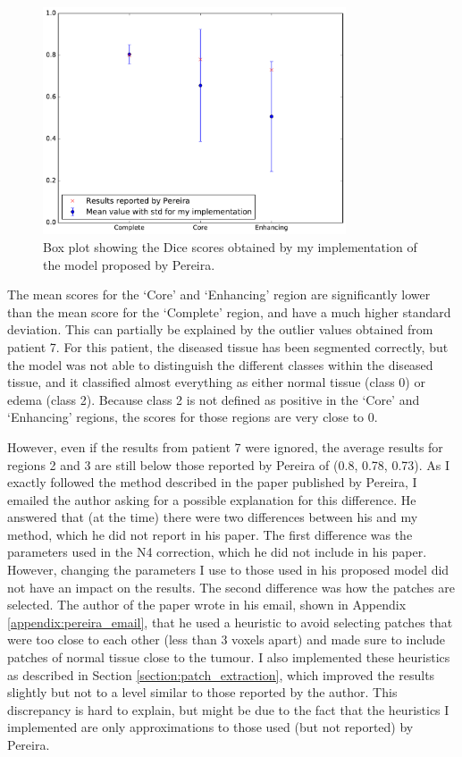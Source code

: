 \documentclass[12pt,a4paper,twoside,openright]{report}
\newlength\figureheight
\newlength\figurewidth
\begin{document}
\begin{figure}
	\centering
%	
	\includegraphics[width=0.8\textwidth]{plots/pereira_box_plot2}
	\caption{Box plot showing the Dice scores obtained by my implementation of the model proposed by Pereira.}
	\label{pereira_box_plot}
\end{figure}

The mean scores for the `Core' and `Enhancing' region are significantly lower than the mean score for the `Complete' region, and have a much higher standard deviation. This can partially be explained by the outlier values obtained from patient 7. For this patient, the diseased tissue has been segmented correctly, but the model was not able to distinguish the different classes within the diseased tissue, and it classified almost everything as either normal tissue (class 0) or edema (class 2). Because class 2 is not defined as positive in the `Core' and `Enhancing' regions, the scores for those regions are very close to 0.  

However, even if the results from patient 7 were ignored, the average results for regions 2 and 3 are still below those reported by Pereira \cite{pereira} of (0.8, 0.78, 0.73). As I exactly followed the method described in the paper published by Pereira, I emailed the author asking for a possible explanation for this difference. He answered that (at the time) there were two differences between his and my method, which he did not report in his paper. The first difference was the parameters used in the N4 correction, which he did not include in his paper. However, changing the parameters I use to those used in his proposed model did not have an impact on the results. The second difference was how the patches are selected. The author of the paper wrote in his email, shown in Appendix \ref{appendix:pereira_email}, that he used a heuristic to avoid selecting patches that were too close to each other (less than 3 voxels apart) and made sure to include patches of normal tissue close to the tumour. I also implemented these heuristics as described in Section \ref{section:patch_extraction}, which improved the results slightly but not to a level similar to those reported by the author. This discrepancy is hard to explain, but might be due to the fact that the heuristics I implemented are only approximations to those used (but not reported) by Pereira.
\end{document}

